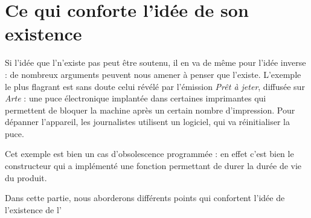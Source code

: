 \section{Ce qui conforte l’idée de son existence}

Si l'idée que l'\op n'existe pas peut être soutenu, il en va de même pour l'idée inverse : de nombreux arguments peuvent nous amener à penser que l'\op existe.
\smallbreak
L'exemple le plus flagrant est sans doute celui révélé par l'émission  \textit{Prêt à jeter}, diffusée sur \textit{Arte} : une puce électronique implantée dans certaines imprimantes qui permettent de bloquer la machine après un certain nombre d'impression. Pour dépanner l'appareil, les journalistes utilisent un logiciel, qui va réinitialiser la puce. 

Cet exemple est bien un cas d'obsolescence programmée : en effet c'est bien le constructeur qui a implémenté une fonction permettant de durer la durée de vie du produit. 

\smallbreak

Dans cette partie, nous aborderons différents points qui confortent l'idée de l’existence de l'\op 